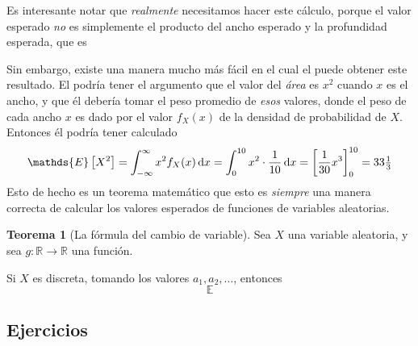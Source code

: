 \documentclass[10pt,twoside=false,twocolumn=false,BCOR=12mm,DIV=calc]{scrartcl} %
\theoremstyle{definition}
\newtheorem{theorem}[section]{Teorema}
\begin{document}
Es interesante notar que \emph{realmente} necesitamos hacer este cálculo, porque el valor esperado \emph{no} es simplemente el producto del ancho esperado y la profundidad esperada, que es %

Sin embargo, existe una manera mucho más fácil en el cual el %
puede obtener este resultado. El podría tener el argumento que el valor del \emph{área} es $x^2$ cuando $x$ es el ancho, y que él debería tomar el peso  promedio de \emph{esos} valores, donde el peso de cada ancho $x$ es dado por el valor $f_X(x)$ de la densidad de probabilidad de $X$. Entonces él podría tener calculado
\begin{equation*}
  \mathds{E}\left[X^2\right]=\int_{-\infty}^{\infty}x^2f_X(x)\dl x=\int_{0}^{10}x^2\cdot\frac{1}{10}\dl x={\left[\frac{1}{30}x^3\right]}_{0}^{10}=33\tfrac{1}{3}%
\end{equation*}
Esto de hecho es un teorema matemático que esto es \emph{siempre} una manera correcta de calcular los valores esperados de funciones de variables aleatorias.

\begin{theorem}[La fórmula del cambio de variable]
  Sea $X$ una variable aleatoria, y sea $g\colon\mathds{R}\rightarrow\mathds{R}$ una función.

  Si $X$ es discreta, tomando los valores $a_1, a_2, \ldots$, entonces
  \begin{equation*}
    \mathds{E}%
  \end{equation*}
\end{theorem}



\subsection{Ejercicios}
\end{document}
